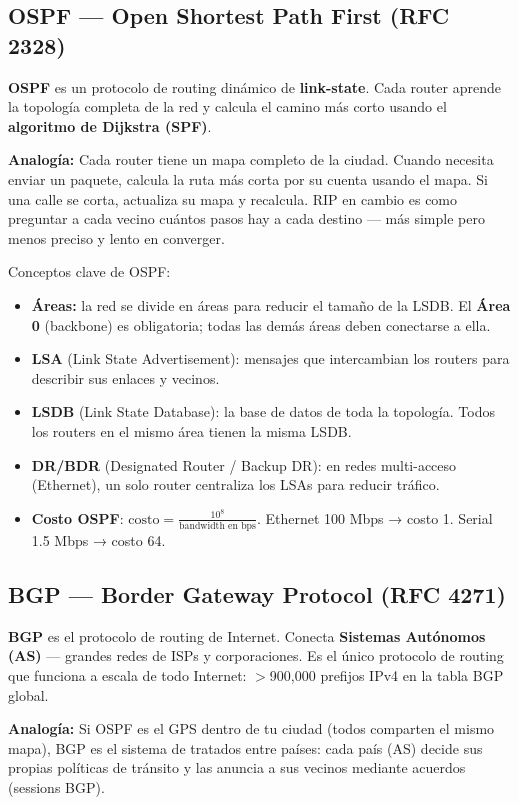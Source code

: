 \subsection{OSPF --- Open Shortest Path First (RFC 2328)}

\begin{concepto}
\textbf{OSPF} es un protocolo de routing dinámico de \textbf{link-state}.
Cada router aprende la topología completa de la red y calcula el camino
más corto usando el \textbf{algoritmo de Dijkstra (SPF)}.

 \textbf{Analogía:} Cada router tiene un mapa completo de
la ciudad. Cuando necesita enviar un paquete, calcula la ruta más corta
por su cuenta usando el mapa. Si una calle se corta, actualiza su mapa
y recalcula. RIP en cambio es como preguntar a cada vecino cuántos pasos
hay a cada destino --- más simple pero menos preciso y lento en converger.
\end{concepto}

Conceptos clave de OSPF:
\begin{itemize}
    \item \textbf{Áreas:} la red se divide en áreas para reducir el tamaño de la LSDB.
          El \textbf{Área 0} (backbone) es obligatoria; todas las demás áreas
          deben conectarse a ella.
    \item \textbf{LSA} (Link State Advertisement): mensajes que intercambian los routers
          para describir sus enlaces y vecinos.
    \item \textbf{LSDB} (Link State Database): la base de datos de toda la topología.
          Todos los routers en el mismo área tienen la misma LSDB.
    \item \textbf{DR/BDR} (Designated Router / Backup DR): en redes multi-acceso
          (Ethernet), un solo router centraliza los LSAs para reducir tráfico.
    \item \textbf{Costo OSPF}: $\text{costo} = \frac{10^8}{\text{bandwidth en bps}}$.
          Ethernet 100 Mbps → costo 1. Serial 1.5 Mbps → costo 64.
\end{itemize}

\subsection{BGP --- Border Gateway Protocol (RFC 4271)}

\begin{concepto}
\textbf{BGP} es el protocolo de routing de Internet. Conecta
\textbf{Sistemas Autónomos (AS)} --- grandes redes de ISPs y corporaciones.
Es el único protocolo de routing que funciona a escala de todo Internet:
$>$900,000 prefijos IPv4 en la tabla BGP global.

 \textbf{Analogía:} Si OSPF es el GPS dentro de tu ciudad
(todos comparten el mismo mapa), BGP es el sistema de tratados entre países:
cada país (AS) decide sus propias políticas de tránsito y las anuncia
a sus vecinos mediante acuerdos (sessions BGP).
\end{concepto}


